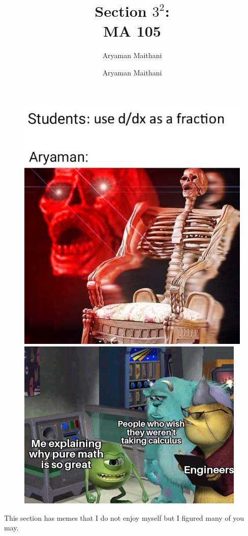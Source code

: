 \documentclass[handout, aspectratio=169]{beamer}
\begin{document}
\begin{frame} 
	\begin{figure}[t]
		\begin{minipage}{0.48\textwidth}
			\centering
			\includegraphics[width=6.25 cm]{9.jpg}
			
		\end{minipage}
		\begin{minipage}{0.48\textwidth}
			\centering
			\includegraphics[width=6.25 cm]{39.png}
			
		\end{minipage}
	\end{figure}
\end{frame}
\author{Aryaman Maithani}
\author{ }
\title{Section $3^2$:\\ MA 105}
\begin{frame} 
	\titlepage
	This section has memes that I do not enjoy myself but I figured many of you may.
\end{frame}
\author{Aryaman Maithani}
\end{document}
